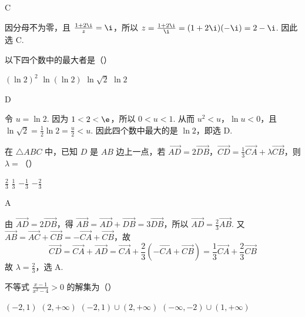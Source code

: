 \begin{answer}
C
\end{answer}

\begin{solution}
因分母不为零，且 \(\frac{1+2\i}{z}=\i\)，所以 \(z=\frac{1+2\i}{\i}=(1+2\i)(-\i)=2-\i\). 因此选 C.
\end{solution}

\begin{problem}
以下四个数中的最大者是（\quad）

\choices
    {\((\ln 2)^{2}\)}
    {\(\ln (\ln 2)\)}
    {\(\ln \sqrt{2}\)}
    {\(\ln 2\)}
\end{problem}

\begin{answer}
D
\end{answer}

\begin{solution}
令 \(u=\ln2\). 因为 \(1<2<\e\)，所以 \(0<u<1\). 从而 \(u^2<u\)，\(\ln u<0\)，且 \(\ln\sqrt2=\frac12\ln2=\frac{u}{2}<u\). 因此四个数中最大的是 \(\ln2\)，即选 D.
\end{solution}

\begin{problem}
在 \(\triangle ABC\) 中，已知 \(D\) 是 \(AB\) 边上一点，若 \(\overrightarrow{AD} = 2\overrightarrow{DB}\)，\(\overrightarrow{CD} = \frac{1}{3}\overrightarrow{CA} + \lambda \overrightarrow{CB}\)，则 \(\lambda =\)（\quad）

\choices
    {\( \frac{2}{3} \)}
    {\(\frac{1}{3}\)}
    {\(-\frac{1}{3}\)}
    {\(-\frac{2}{3}\)}
\end{problem}

\begin{answer}
A
\end{answer}

\begin{solution}
由 \(\overrightarrow{AD}=2\overrightarrow{DB}\)，得 \(\overrightarrow{AB}=\overrightarrow{AD}+\overrightarrow{DB}=3\overrightarrow{DB}\)，所以 \(\overrightarrow{AD}=\frac{2}{3}\overrightarrow{AB}\). 又 \(\overrightarrow{AB}=\overrightarrow{AC}+\overrightarrow{CB}=-\overrightarrow{CA}+\overrightarrow{CB}\)，故
\[
\overrightarrow{CD}=\overrightarrow{CA}+\overrightarrow{AD}
=\overrightarrow{CA}+\frac{2}{3}\left(-\overrightarrow{CA}+\overrightarrow{CB}\right)
=\frac{1}{3}\overrightarrow{CA}+\frac{2}{3}\overrightarrow{CB}
\]
故 \(\lambda=\frac{2}{3}\)，选 A.
\end{solution}

\begin{problem}
不等式 \(\frac{x - 1}{x^2 - 4} > 0\) 的解集为（\quad）

\choices
    {\((-2, 1)\)}
    {\((2, +\infty)\)}
    {\((-2,1)\cup (2, + \infty)\)}
    {\((- \infty, -2) \cup (1, +\infty)\)}
\end{problem}

